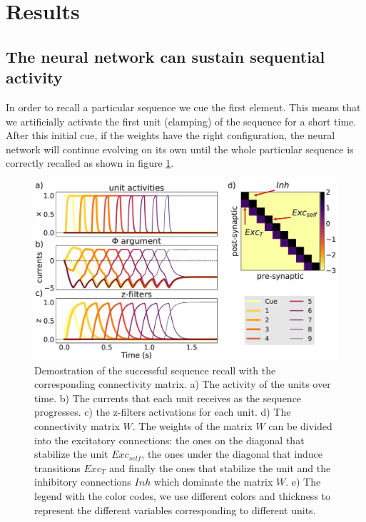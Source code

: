 \documentclass{esannV2}
\begin{document}
 
\section{Results}

\subsection{The neural network can sustain sequential activity}

In order to recall a particular sequence we cue the first element. This means that we artificially activate the first unit (clamping) of the sequence for a short time. After this initial cue, if the weights have the right configuration, the neural network will continue evolving on its own until the whole particular sequence is correctly recalled as shown in figure  \ref{Fig:recall}.

\begin{figure}[h!]
\centering
\includegraphics[scale=0.20]{recall.eps}
\caption{Demostration of the successful sequence recall with the corresponding connectivity matrix. a) The activity of the units over time. b) The currents that each unit receives as the sequence progresses. c) the z-filters activations for each unit. d) The connectivity matrix $W$. The weights of the matrix $W$ can be divided into the excitatory connections: the ones on the diagonal that stabilize the unit $Exc_{self}$, the ones under the diagonal that induce transitions $Exc_{T}$ and finally the ones that stabilize the unit  and the inhibitory connections $Inh$ which dominate the matrix $W$. e) The legend with the color codes, we use different colors and thickness to represent the different variables corresponding to different units. }\label{Fig:recall}
\end{figure}
\end{document}

